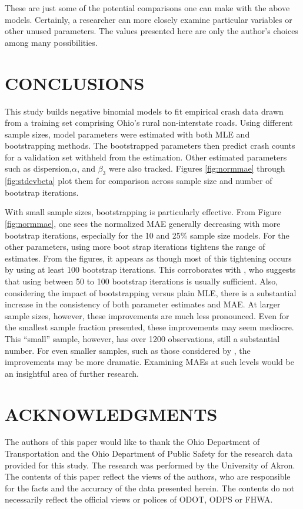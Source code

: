 \documentclass[titlepage,12pt,times,nopageno]{article}
\begin{document}
These are just some of the potential comparisons one can make with the above models.  Certainly, a researcher can more closely examine particular variables or other unused parameters.  The values presented here are only the author's choices among many possibilities.
\section*{\normalsize CONCLUSIONS}
This study builds negative binomial models to fit empirical crash data drawn from a training set comprising Ohio's rural non-interstate roads.  Using different sample sizes, model parameters were estimated with both MLE and bootstrapping methods.  The bootstrapped parameters then predict crash counts for a validation set withheld from the estimation.  Other estimated parameters such as dispersion,$\alpha$, and $\beta_3$ were also tracked.  Figures \ref{fig:normmae} through \ref{fig:stdevbeta} plot them for comparison across sample size and number of bootstrap iterations.\par
With small sample sizes, bootstrapping is particularly effective.  From Figure \ref{fig:normmae}, one sees the normalized MAE generally decreasing with more bootstrap iterations, especially for the 10 and 25\% sample size models.  For the other parameters, using more boot strap iterations tightens the range of estimates.  From the figures, it appears as though most of this tightening occurs by using at least 100 bootstrap iterations.  This corroborates with \citet{greene2007limdep}, who suggests that using between 50 to 100 bootstrap iterations is usually sufficient.  Also, considering the impact of bootstrapping versus plain MLE, there is a substantial increase in the consistency of both parameter estimates and MAE.  At larger sample sizes, however, these improvements are much less pronounced.  Even for the smallest sample fraction presented, these improvements may seem mediocre.  This ``small'' sample, however, has over 1200 observations, still a substantial number.  For even smaller samples, such as those considered by \citet{zhang2007edp}, the improvements may be more dramatic.  Examining MAEs at such levels would be an insightful area of further research.\par
\section*{\normalsize ACKNOWLEDGMENTS}
The authors of this paper would like to thank the Ohio Department of Transportation and the Ohio Department of Public Safety for the research data provided for this study.  The research was performed by the University of Akron.  The contents of this paper reflect the views of the authors, who are responsible for the facts and the accuracy of the data presented herein.  The contents do not necessarily reflect the official views or polices of ODOT, ODPS or FHWA.  
\newpage
%
\end{document}
